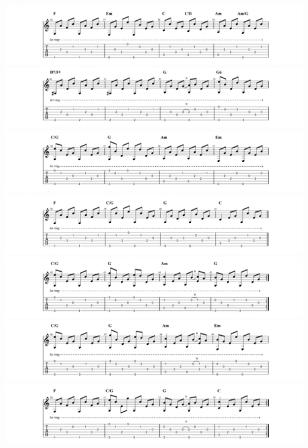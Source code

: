 \documentclass[]{book}
\begin{document}
\includegraphics{notes_and_tabs/streets_of_london_7.png}
\includegraphics{notes_and_tabs/streets_of_london_8.png}
\includegraphics{notes_and_tabs/streets_of_london_9.png}
\includegraphics{notes_and_tabs/streets_of_london_10.png}
\includegraphics{notes_and_tabs/streets_of_london_11.png}
\includegraphics{notes_and_tabs/streets_of_london_12.png}
\includegraphics{notes_and_tabs/streets_of_london_13.png}
\end{document}
